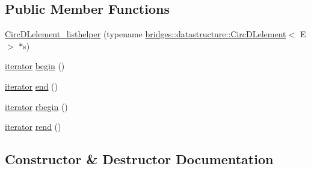 \subsection*{Public Member Functions}
\begin{DoxyCompactItemize}
\item 
\hyperlink{classbridges_1_1datastructure_1_1_circ_d_lelement_1_1_circ_d_lelement__listhelper_a3818959b579e2c397721cb7379b183b2}{Circ\+D\+Lelement\+\_\+listhelper} (typename \hyperlink{classbridges_1_1datastructure_1_1_circ_d_lelement}{bridges\+::datastructure\+::\+Circ\+D\+Lelement}$<$ E $>$ $\ast$s)
\item 
\hyperlink{classbridges_1_1datastructure_1_1_circ_d_lelement_1_1_circ_d_lelement__listhelper_1_1iterator}{iterator} \hyperlink{classbridges_1_1datastructure_1_1_circ_d_lelement_1_1_circ_d_lelement__listhelper_a41cd9455769e78983c62de22d4a6925c}{begin} ()
\item 
\hyperlink{classbridges_1_1datastructure_1_1_circ_d_lelement_1_1_circ_d_lelement__listhelper_1_1iterator}{iterator} \hyperlink{classbridges_1_1datastructure_1_1_circ_d_lelement_1_1_circ_d_lelement__listhelper_a822b5a9427e017cb2363d681a78e3c70}{end} ()
\item 
\hyperlink{classbridges_1_1datastructure_1_1_circ_d_lelement_1_1_circ_d_lelement__listhelper_1_1iterator}{iterator} \hyperlink{classbridges_1_1datastructure_1_1_circ_d_lelement_1_1_circ_d_lelement__listhelper_aec74a9bcb91e1c12367d6ff82c64633e}{rbegin} ()
\item 
\hyperlink{classbridges_1_1datastructure_1_1_circ_d_lelement_1_1_circ_d_lelement__listhelper_1_1iterator}{iterator} \hyperlink{classbridges_1_1datastructure_1_1_circ_d_lelement_1_1_circ_d_lelement__listhelper_a0d26c54b82fcd733dcb445e0c39dc28e}{rend} ()
\end{DoxyCompactItemize}


\subsection{Constructor \& Destructor Documentation}
\mbox{\label{classbridges_1_1datastructure_1_1_circ_d_lelement_1_1_circ_d_lelement__listhelper_a3818959b579e2c397721cb7379b183b2}} 
